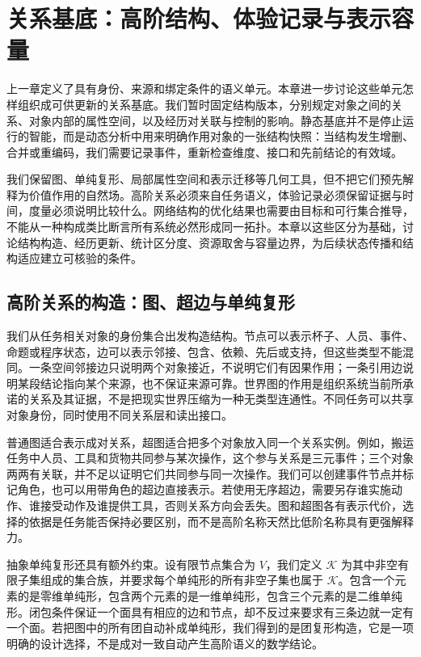 \chapter{关系基底：高阶结构、体验记录与表示容量}
\label{chp:static_substrate}

上一章定义了具有身份、来源和绑定条件的语义单元。本章进一步讨论这些单元怎样组织成可供更新的关系基底。我们暂时固定结构版本，分别规定对象之间的关系、对象内部的属性空间，以及经历对关联与控制的影响。静态基底并不是停止运行的智能，而是动态分析中用来明确作用对象的一张结构快照：当结构发生增删、合并或重编码，我们需要记录事件，重新检查维度、接口和先前结论的有效域。

我们保留图、单纯复形、局部属性空间和表示迁移等几何工具，但不把它们预先解释为价值作用的自然场。高阶关系必须来自任务语义，体验记录必须保留证据与时间，度量必须说明比较什么。网络结构的优化结果也需要由目标和可行集合推导，不能从一种构成类比断言所有系统必然形成同一拓扑。本章以这些区分为基础，讨论结构构造、经历更新、统计区分度、资源取舍与容量边界，为后续状态传播和结构适应建立可核验的条件。

\section{高阶关系的构造：图、超边与单纯复形}
\label{sec:morpho_elements}

我们从任务相关对象的身份集合出发构造结构。节点可以表示杯子、人员、事件、命题或程序状态，边可以表示邻接、包含、依赖、先后或支持，但这些类型不能混同。一条空间邻接边只说明两个对象接近，不说明它们有因果作用；一条引用边说明某段结论指向某个来源，也不保证来源可靠。世界图的作用是组织系统当前所承诺的关系及其证据，不是把现实世界压缩为一种无类型连通性。不同任务可以共享对象身份，同时使用不同关系层和读出接口。

普通图适合表示成对关系，超图适合把多个对象放入同一个关系实例。例如，搬运任务中人员、工具和货物共同参与某次操作，这个参与关系是三元事件；三个对象两两有关联，并不足以证明它们共同参与同一次操作。我们可以创建事件节点并标记角色，也可以用带角色的超边直接表示。若使用无序超边，需要另存谁实施动作、谁接受动作及谁提供工具，否则关系方向会丢失。图和超图各有表示代价，选择的依据是任务能否保持必要区别，而不是高阶名称天然比低阶名称具有更强解释力。

抽象单纯复形还具有额外约束。设有限节点集合为 $V$，我们定义 $\mathcal K$ 为其中非空有限子集组成的集合族，并要求每个单纯形的所有非空子集也属于 $\mathcal K$。包含一个元素的是零维单纯形，包含两个元素的是一维单纯形，包含三个元素的是二维单纯形。闭包条件保证一个面具有相应的边和节点，却不反过来要求有三条边就一定有一个面。若把图中的所有团自动补成单纯形，我们得到的是团复形构造，它是一项明确的设计选择，不是成对一致自动产生高阶语义的数学结论。

